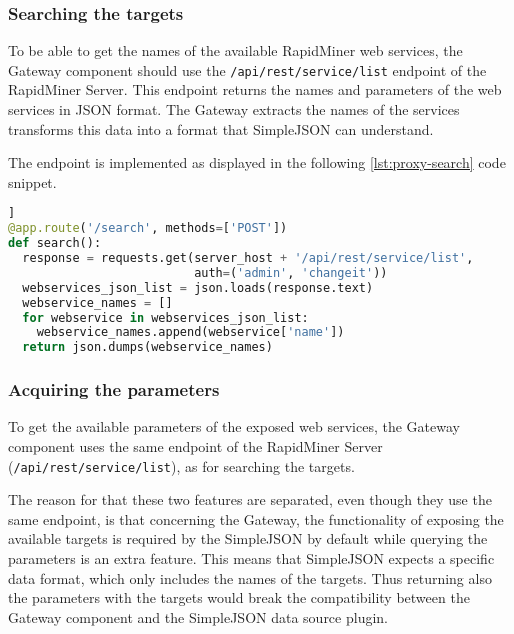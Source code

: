 \subsubsection{Searching the targets}

To be able to get the names of the available RapidMiner web services, the Gateway component should use the \texttt{/api/rest/service/list} endpoint of the RapidMiner Server. This endpoint returns the names and parameters of the web services in JSON format. The Gateway extracts the names of the services transforms this data into a format that SimpleJSON can understand.

The endpoint is implemented as displayed in the following \ref{lst:proxy-search} code snippet. 

\begin{minipage}{\linewidth}
\begin{lstlisting}[language=Python, caption={Get the names of the web services}, label={lst:proxy-search}]]
@app.route('/search', methods=['POST'])
def search():
  response = requests.get(server_host + '/api/rest/service/list',
                          auth=('admin', 'changeit'))
  webservices_json_list = json.loads(response.text)
  webservice_names = []
  for webservice in webservices_json_list:
    webservice_names.append(webservice['name'])
  return json.dumps(webservice_names)
\end{lstlisting}
\end{minipage}
\subsubsection{Acquiring the parameters}

To get the available parameters of the exposed web services, the Gateway component uses the same endpoint of the RapidMiner Server (\texttt{/api/rest/service/list}), as for searching the targets.

The reason for that these two features are separated, even though they use the same endpoint, is that concerning the Gateway, the functionality of exposing the available targets is required by the SimpleJSON by default while querying the parameters is an extra feature. This means that SimpleJSON expects a specific data format, which only includes the names of the targets. Thus returning also the parameters with the targets would break the compatibility between the Gateway component and the SimpleJSON data source plugin.

